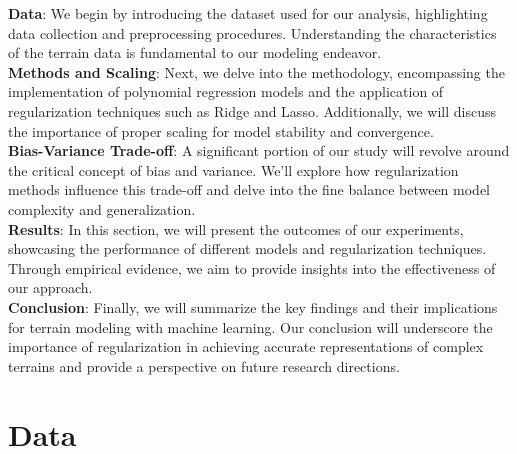 \documentclass[twoside,11pt]{report}
\begin{document}
\textbf{Data}: We begin by introducing the dataset used for our analysis, highlighting data collection and preprocessing procedures. 
Understanding the characteristics of the terrain data is fundamental to our modeling endeavor.\\
\textbf{Methods and Scaling}: Next, we delve into the methodology, encompassing the implementation of polynomial regression 
models and the application of regularization techniques such as Ridge and Lasso. Additionally, we will discuss the 
importance of proper scaling for model stability and convergence.\\
\textbf{Bias-Variance Trade-off}: A significant portion of our study will revolve around the critical concept of bias and 
variance. We'll explore how regularization methods influence this trade-off and delve into the fine balance between 
model complexity and generalization.\\
\textbf{Results}: In this section, we will present the outcomes of our experiments, showcasing the performance of different 
models and regularization techniques. Through empirical evidence, we aim to provide insights into the effectiveness of our approach.\\
\textbf{Conclusion}: Finally, we will summarize the key findings and their implications for terrain modeling with machine learning. 
Our conclusion will underscore the importance of regularization in achieving accurate representations of complex terrains and 
provide a perspective on future research directions.









\section{Data}
\label{sec:data}
\end{document}
